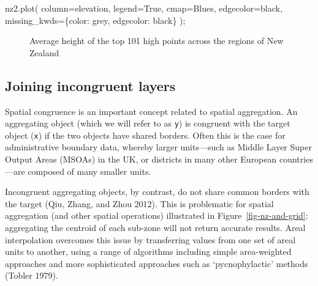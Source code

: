 \documentclass[
  letterpaper,
]{krantz}
\newenvironment{Shaded}{\begin{snugshade}}{\end{snugshade}}
\newcommand{\NormalTok}[1]{\textcolor[rgb]{0.00,0.23,0.31}{#1}}
\newcommand{\OperatorTok}[1]{\textcolor[rgb]{0.37,0.37,0.37}{#1}}
\newcommand{\StringTok}[1]{\textcolor[rgb]{0.13,0.47,0.30}{#1}}
\newcommand{\VariableTok}[1]{\textcolor[rgb]{0.07,0.07,0.07}{#1}}
\begin{document}
\begin{Shaded}
\begin{Highlighting}[]
\NormalTok{nz2.plot(}
\NormalTok{  column}\OperatorTok{=}\StringTok{\textquotesingle{}elevation\textquotesingle{}}\NormalTok{, }
\NormalTok{  legend}\OperatorTok{=}\VariableTok{True}\NormalTok{,}
\NormalTok{  cmap}\OperatorTok{=}\StringTok{\textquotesingle{}Blues\textquotesingle{}}\NormalTok{, edgecolor}\OperatorTok{=}\StringTok{\textquotesingle{}black\textquotesingle{}}\NormalTok{,}
\NormalTok{  missing\_kwds}\OperatorTok{=}\NormalTok{\{}\StringTok{\textquotesingle{}color\textquotesingle{}}\NormalTok{: }\StringTok{\textquotesingle{}grey\textquotesingle{}}\NormalTok{, }\StringTok{\textquotesingle{}edgecolor\textquotesingle{}}\NormalTok{: }\StringTok{\textquotesingle{}black\textquotesingle{}}\NormalTok{\}}
\NormalTok{)}\OperatorTok{;}
\end{Highlighting}
\end{Shaded}

\begin{figure}[H]


\caption{\label{fig-nz-avg-nz-height}Average height of the top 101 high
points across the regions of New Zealand}

\end{figure}%

\subsection{Joining incongruent
layers}\label{sec-joining-incongruent-layers}

Spatial congruence is an important concept related to spatial
aggregation. An aggregating object (which we will refer to as
\texttt{y}) is congruent with the target object (\texttt{x}) if the two
objects have shared borders. Often this is the case for administrative
boundary data, whereby larger units---such as Middle Layer Super Output
Areas (MSOAs) in the UK, or districts in many other European
countries---are composed of many smaller units.

Incongruent aggregating objects, by contrast, do not share common
borders with the target (Qiu, Zhang, and Zhou 2012). This is problematic
for spatial aggregation (and other spatial operations) illustrated in
Figure~\ref{fig-nz-and-grid}: aggregating the centroid of each sub-zone
will not return accurate results. Areal interpolation overcomes this
issue by transferring values from one set of areal units to another,
using a range of algorithms including simple area-weighted approaches
and more sophisticated approaches such as `pycnophylactic' methods
(Tobler 1979).
\end{document}
